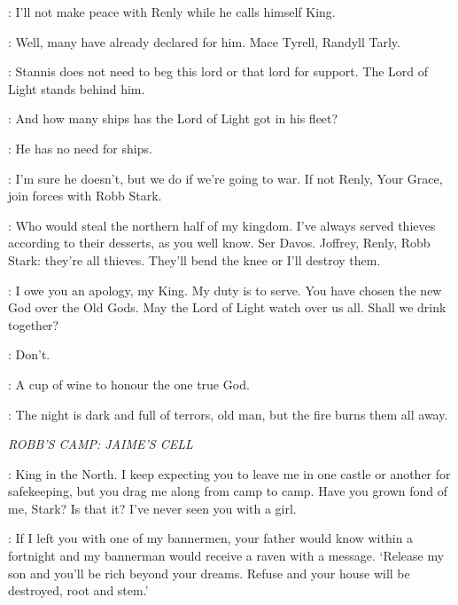 \STANNIS: I'll not make peace with Renly while he calls himself King.

\DAVOS: Well, many have already declared for him. Mace Tyrell, Randyll Tarly.

\MELISANDRE: Stannis does not need to beg this lord or that lord for support. The Lord of Light stands behind him.

\DAVOS: And how many ships has the Lord of Light got in his fleet?

\MELISANDRE: He has no need for ships.

\DAVOS: I'm sure he doesn't, but we do if we're going to war. If not Renly, Your Grace, join forces with Robb Stark.

\STANNIS: Who would steal the northern half of my kingdom. I've always served thieves according to their desserts, as you well know. Ser Davos. Joffrey, Renly, Robb Stark: they're all thieves. They'll bend the knee or I'll destroy them.

\CRESSEN:  I owe you an apology, my King. My duty is to serve. You have chosen the new God over the Old Gods. May the Lord of Light watch over us all.  Shall we drink together?

\DAVOS:  Don't.

\CRESSEN: A cup of wine to honour the one true God.


\MELISANDRE: The night is dark and full of terrors, old man, but the fire burns them all away.

\newpage

\scene

\textit{ROBB'S CAMP: JAIME'S CELL}


\JAIME: King in the North. I keep expecting you to leave me in one castle or another for safekeeping, but you drag me along from camp to camp. Have you grown fond of me, Stark? Is that it? I've never seen you with a girl.

\ROBB: If I left you with one of my bannermen, your father would know within a fortnight and my bannerman would receive a raven with a message. `Release my son and you'll be rich beyond your dreams. Refuse and your house will be destroyed, root and stem.'

